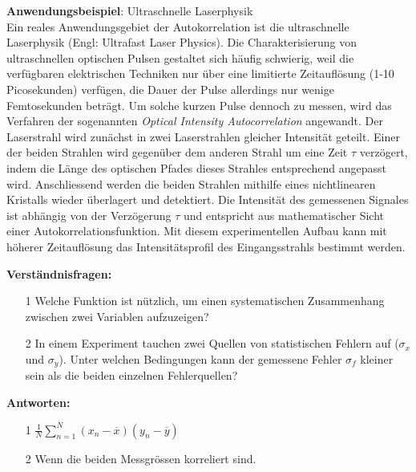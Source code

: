 \begin{center}
\begin{tcolorbox}[enhanced,width=6in,drop fuzzy shadow southwest,
colframe=blue!50!black,colback=blue!01]
\textbf{Anwendungsbeispiel}: Ultraschnelle Laserphysik \\
Ein reales Anwendungsgebiet der  Autokorrelation ist die  ultraschnelle Laserphysik (Engl: Ultrafast Laser Physics). Die Charakterisierung von ultraschnellen optischen Pulsen gestaltet sich häufig  schwierig, weil die verfügbaren elektrischen Techniken nur über eine limitierte Zeitauflösung (1-10 Picosekunden) verfügen, die Dauer der Pulse allerdings nur wenige Femtosekunden beträgt. Um solche kurzen Pulse dennoch zu messen, wird das Verfahren der sogenannten \textit{Optical Intensity Autocorrelation} angewandt. Der Laserstrahl wird zunächst in zwei Laserstrahlen gleicher Intensität geteilt. Einer der beiden Strahlen wird gegenüber dem anderen Strahl um eine Zeit $\tau$ verzögert, indem die Länge des optischen Pfades dieses Strahles entsprechend angepasst wird. Anschliessend werden die beiden Strahlen mithilfe eines nichtlinearen Kristalls  wieder überlagert und detektiert. Die Intensität des gemessenen Signales ist abhängig von der Verzögerung $\tau$ und entspricht aus mathematischer Sicht einer Autokorrelationsfunktion. Mit diesem experimentellen Aufbau kann mit höherer Zeitauflösung das Intensitätsprofil des Eingangsstrahls bestimmt werden. 
\end{tcolorbox}
\end{center}



\begin{tcolorbox}[enhanced,width=6in,
    fontupper=\small,drop fuzzy shadow southwest,
    colframe=black!50!black,colback=black!5]
\textbf{Verständnisfragen:} \\
\begin{enumerate}
\item[1] Welche Funktion ist nützlich, um einen systematischen
Zusammenhang zwischen zwei Variablen aufzuzeigen?
\item[2] In einem Experiment tauchen zwei Quellen von statistischen
Fehlern auf ($\sigma_x$ und $\sigma_y$). Unter welchen Bedingungen kann
der gemessene Fehler $\sigma_f$ kleiner sein als die beiden
einzelnen Fehlerquellen?
\end{enumerate}
\end{tcolorbox}

\begin{tcolorbox}[enhanced,width=6in,
    fontupper=\small,drop fuzzy shadow southwest,
    colframe=black!50!black,colback=black!5]
\textbf{Antworten:} \\
\begin{enumerate}
\item[1] $\frac{1}{N} \sum_{n = 1}^N (x_n - \overline{x})(y_n - \overline{y})$
\item[2] Wenn die beiden Messgrössen korreliert sind.
\end{enumerate}
\end{tcolorbox}